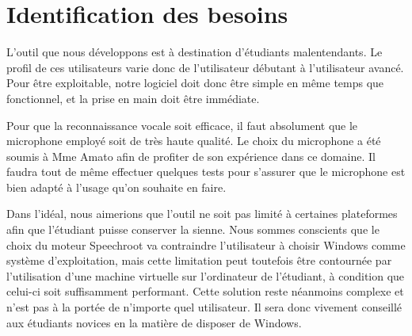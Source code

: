 \chapter{Identification des besoins}

L'outil que nous développons est à destination d'étudiants malentendants.
Le profil de ces utilisateurs varie donc de l'utilisateur débutant à l'utilisateur avancé.
Pour être exploitable, notre logiciel doit donc être simple en même temps que fonctionnel, et la prise en main doit être immédiate.

Pour que la reconnaissance vocale soit efficace, il faut absolument que le microphone employé soit de très haute qualité.
Le choix du microphone a été soumis à Mme Amato afin de profiter de son expérience dans ce domaine.
Il faudra tout de même effectuer quelques tests pour s'assurer que le microphone est bien adapté à l'usage qu'on souhaite en faire.

Dans l'idéal, nous aimerions que l'outil ne soit pas limité à certaines plateformes afin que l'étudiant puisse conserver la sienne.
Nous sommes conscients que le choix du moteur Speechroot va contraindre l'utilisateur à choisir Windows comme système d'exploitation, mais cette limitation peut toutefois être contournée par l'utilisation d'une machine virtuelle sur l'ordinateur de l'étudiant, à condition que celui-ci soit suffisamment performant.
Cette solution reste néanmoins complexe et n'est pas à la portée de n'importe quel utilisateur.
Il sera donc vivement conseillé aux étudiants novices en la matière de disposer de Windows.